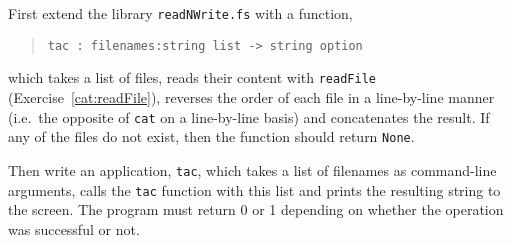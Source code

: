 First extend the library \lstinline{readNWrite.fs} with a function,
\begin{quote}
  \mbox{\lstinline!tac : filenames:string list -> string option!}
\end{quote}
which takes a list of files, reads their content with \lstinline{readFile} (Exercise~\ref{cat:readFile}), reverses the order of each file in a line-by-line manner (i.e.\ the opposite of \lstinline{cat} on a line-by-line basis) and concatenates the result.  If any of the files do not exist, then the function should return \lstinline{None}.

Then write an application, \lstinline[language=console]{tac}, which takes a list of filenames as command-line arguments, calls the \lstinline{tac} function with this list and prints the resulting string to the screen. The program must return 0 or 1 depending on whether the operation was successful or not.
